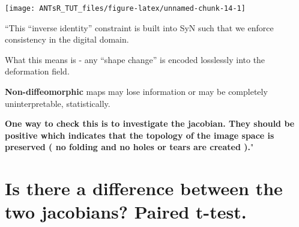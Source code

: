 \documentclass[]{tufte-handout}
\newenvironment{Shaded}{}{}
\newcommand{\DataTypeTok}[1]{\textcolor[rgb]{0.56,0.13,0.00}{#1}}
\newcommand{\DecValTok}[1]{\textcolor[rgb]{0.25,0.63,0.44}{#1}}
\newcommand{\KeywordTok}[1]{\textcolor[rgb]{0.00,0.44,0.13}{\textbf{#1}}}
\newcommand{\NormalTok}[1]{#1}
\newcommand{\OperatorTok}[1]{\textcolor[rgb]{0.40,0.40,0.40}{#1}}
\newcommand{\OtherTok}[1]{\textcolor[rgb]{0.00,0.44,0.13}{#1}}
\newcommand{\StringTok}[1]{\textcolor[rgb]{0.25,0.44,0.63}{#1}}
\begin{document}
\texttt{[image: ANTsR\_TUT\_files/figure-latex/unnamed-chunk-14-1]}

``This ``inverse identity'' constraint is built into SyN such that we
enforce consistency in the digital domain.

What this means is - any ``shape change'' is encoded losslessly into the
deformation field.

\textbf{Non-diffeomorphic} maps may lose information or may be
completely uninterpretable, statistically.

\textbf{One way to check this is to investigate the jacobian. They
should be positive which indicates that the topology of the image space
is preserved ( no folding and no holes or tears are created ).}"

\begin{Shaded}
\end{Shaded}

\hypertarget{is-there-a-difference-between-the-two-jacobians-paired-t-test.}{%
\section{Is there a difference between the two jacobians? Paired
t-test.}\label{is-there-a-difference-between-the-two-jacobians-paired-t-test.}}

\begin{Shaded}
\end{Shaded}
\end{document}
